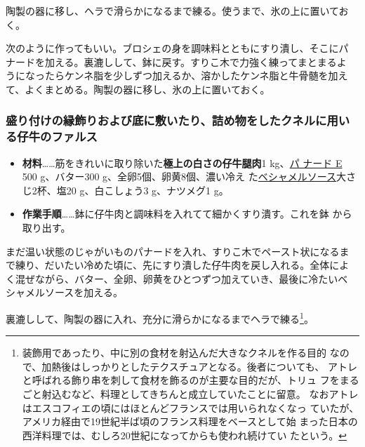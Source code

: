 \begin{recette}
陶製の器に移し、ヘラで滑らかになるまで練る。使うまで、氷の上に置いてお
く。

次のように作ってもいい。ブロシェの身を調味料とともにすり潰し、そこにパ
ナードを加える。裏漉しして、鉢に戻す。すりこ木で力強く練ってまとまるよ
うになったらケンネ脂を少しずつ加えるか、溶かしたケンネ脂と牛骨髄を加え
て、よくまとめる。陶製の器に移し、氷の上に置いておく。

\maeaki

\hypertarget{farce-de-veau-pour-bordures}{%
\subsubsection{盛り付けの縁飾りおよび底に敷いたり、詰め物をしたクネルに用いる仔牛のファルス}\label{farce-de-veau-pour-bordures}}



\begin{itemize}
\item
  \textbf{材料}\ldots{}\ldots{}筋をきれいに取り除いた\textbf{極上の白さの仔牛腿肉}1
  kg、\protect\hyperlink{panade-e}{パ ナード E} 500 g、バター300
  g、全卵5個、卵黄8個、濃い冷え
  た\protect\hyperlink{sauce-bechamel}{ベシャメルソース}大さじ2杯、塩20
  g、白こしょう3 g、ナツメグ1 g。
\item
  \textbf{作業手順}\ldots{}\ldots{}鉢に仔牛肉と調味料を入れてて細かくすり潰す。これを鉢
  から取り出す。
\end{itemize}

まだ温い状態のじゃがいものパナードを入れ、すりこ木でペースト状になるま
で練り、だいたい冷めた頃に、先にすり潰した仔牛肉を戻し入れる。全体によ
く混ぜながら、バター、全卵、卵黄をひとつずつ加えていき、最後に冷たいベ
シャメルソースを加える。

裏漉しして、陶製の器に入れ、充分に滑らかになるまでヘラで練る\footnote{装飾用であったり、中に別の食材を射込んだ大きなクネルを作る目的
  なので、加熱後はしっかりとしたテクスチュアとなる。後者についても、
  アトレと呼ばれる飾り串を刺して食材を飾るのが主要な目的だが、トリュ
  フをまるごと射込むなど、料理としてきちんと成立していたことに留意。
  なおアトレはエスコフィエの頃にはほとんどフランスでは用いられなくなっ
  ていたが、アメリカ経由で19世紀半ば頃のフランス料理をベースとして始
  まった日本の西洋料理では、むしろ20世紀になってからも使われ続けてい
  たという。}。


\end{recette}
